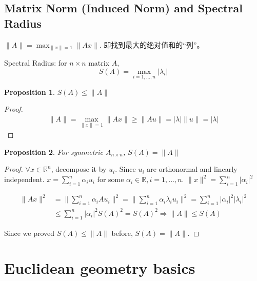 \documentclass[11pt,a4paper]{article}
\newtheorem{proposition}{Proposition}
\begin{document}
\subsection{Matrix Norm (Induced Norm) and Spectral Radius}
$\|A\|=\max _{\|x\|=1}\|A x\|$. 即找到最大的绝对值和的“列”。

Spectral Radius: for $n\times n$ matrix $A$, $$S(A)=\max_{i=1,...,n}|\lambda_i|$$

\begin{proposition}
$S(A)\leq \|A\|$
\end{proposition}
\begin{proof}
\begin{equation}
    \begin{aligned}
        \|A\|=\max _{\|x\|=1}\|A x\|\geq \|Au\|=|\lambda|\|u\|=|\lambda|
    \end{aligned}
    \nonumber
\end{equation}
\end{proof}

\begin{proposition}
    For symmetric $A_{n\times n}$, $S(A)= \|A\|$
\end{proposition}
\begin{proof}
\quad

$\forall x\in \mathbb{R}^n$, decompose it by $u_i$.
Since $u_i$ are orthonormal and linearly independent. $x=\sum_{i=1}^n\alpha_i u_i$ for some $\alpha_i\in \mathbb{R},i=1,...,n$. $\|x\|^2=\sum_{i=1}^n|\alpha_i|^2$

\begin{equation}
    \begin{aligned}
        \|Ax\|^2&=\|\sum_{i=1}^n\alpha_i A u_i\|^2=\|\sum_{i=1}^n\alpha_i \lambda_i u_i\|^2=\sum_{i=1}^n|\alpha_i|^2|\lambda_i|^2\\
        &\leq \sum_{i=1}^n|\alpha_i|^2S(A)^2=S(A)^2 \Rightarrow	\|A\|\leq S(A)
    \end{aligned}
    \nonumber
\end{equation}

Since we proved $S(A)\leq \|A\|$ before, $S(A)=\|A\|$.
\end{proof}









\section{Euclidean geometry basics}
\end{document}
